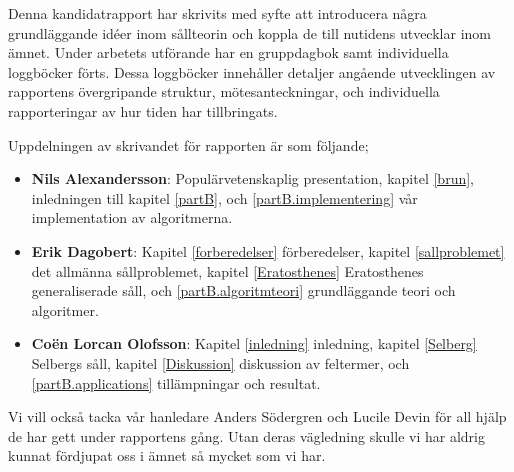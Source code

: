 Denna kandidatrapport har skrivits med syfte att introducera några grundläggande idéer inom sållteorin och koppla de till nutidens utvecklar inom ämnet.
Under arbetets utförande har en gruppdagbok samt individuella loggböcker förts.
Dessa loggböcker innehåller detaljer angående utvecklingen av rapportens övergripande struktur, mötesanteckningar, och individuella rapporteringar av hur tiden har tillbringats.

Uppdelningen av skrivandet för rapporten är som följande;
\begin{itemize}
    \item \textbf{Nils Alexandersson}: Populärvetenskaplig presentation, kapitel \ref{brun}, inledningen till kapitel \ref{partB}, och \ref{partB.implementering} vår implementation av algoritmerna.
    \item \textbf{Erik Dagobert}: Kapitel \ref{forberedelser} förberedelser, kapitel \ref{sallproblemet} det allmänna sållproblemet, kapitel \ref{Eratosthenes} Eratosthenes generaliserade såll, och \ref{partB.algoritmteori} grundläggande teori och algoritmer. 
    \item \textbf{Coën Lorcan Olofsson}: Kapitel \ref{inledning} inledning, kapitel \ref{Selberg} Selbergs såll, kapitel \ref{Diskussion} diskussion av feltermer, och \ref{partB.applications} tillämpningar och resultat.
\end{itemize}
Vi vill också tacka vår hanledare Anders Södergren och Lucile Devin för all hjälp de har gett under rapportens gång. 
Utan deras vägledning skulle vi har aldrig kunnat fördjupat oss i ämnet så mycket som vi har.